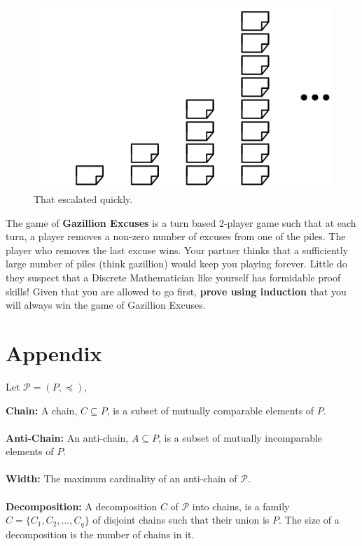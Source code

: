 \documentclass[addpoints]{exam}
\begin{document}
\begin{questions}
\begin{figure}[ht]
  \centering
  \includegraphics{excuses.png}
  \caption{That escalated quickly.}
  \label{fig:Piles of excuses}
\end{figure}

The game of \textbf{Gazillion Excuses} is a turn based 2-player game such that at each turn, a player removes a non-zero number of excuses from one of the piles. The player who removes the last excuse wins. Your partner thinks that a sufficiently large number of piles (think gazillion) would keep you playing forever. Little do they suspect that a Discrete Mathematician like yourself has formidable proof skills! Given that you are allowed to go first, \textbf{prove using induction} that you will always win the game of Gazillion Excuses. 

\appendix

\section{Appendix}
Let $\mathcal{P}= (P, \preccurlyeq)$,

\textbf{Chain:} A chain, $C\subseteq P$, is a subset of mutually comparable elements of $P$.\\\\
\textbf{Anti-Chain:} An anti-chain, $A \subseteq P$, is a subset of mutually incomparable elements of $P$.\\\\
\textbf{Width:} The maximum cardinality of an anti-chain of $\mathcal{P}$.\\\\
\textbf{Decomposition:} A decomposition $C$ of $\mathcal{P}$ into chains, is a family $C = \{C_1,C_2,...,C_q\}$ of disjoint chains such that their union is $P$. The size of a decomposition is the number of chains in it.










\end{questions}
\end{document}

